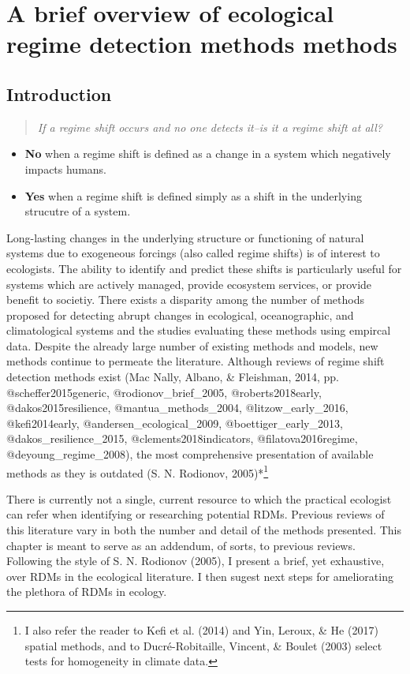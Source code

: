 \documentclass[12pt,twoside,openany]{reedthesis}
\providecommand{\tightlist}{%
  \setlength{\itemsep}{0pt}\setlength{\parskip}{0pt}}
\begin{document}
\hypertarget{rdmReview}{%
\chapter{A brief overview of ecological regime detection methods methods}\label{rdmReview}}

\hypertarget{introduction}{%
\section{Introduction}\label{introduction}}
\begin{quote}
\emph{If a regime shift occurs and no one detects it--is it a regime shift at all?}
\end{quote}
\begin{itemize}
\tightlist
\item
  \textbf{No} when a regime shift is defined as a change in a system which negatively impacts humans.
\item
  \textbf{Yes} when a regime shift is defined simply as a shift in the underlying strucutre of a system.
\end{itemize}
Long-lasting changes in the underlying structure or functioning of natural systems due to exogeneous forcings (also called regime shifts) is of interest to ecologists. The ability to identify and predict these shifts is particularly useful for systems which are actively managed, provide ecosystem services, or provide benefit to societiy. There exists a disparity among the number of methods proposed for detecting abrupt changes in ecological, oceanographic, and climatological systems and the studies evaluating these methods using empircal data. Despite the already large number of existing methods and models, new methods continue to permeate the literature. Although reviews of regime shift detection methods exist (Mac Nally, Albano, \& Fleishman, 2014, pp. @scheffer2015generic, @rodionov\_brief\_2005, @roberts2018early, @dakos2015resilience, @mantua\_methods\_2004, @litzow\_early\_2016, @kefi2014early, @andersen\_ecological\_2009, @boettiger\_early\_2013, @dakos\_resilience\_2015, @clements2018indicators, @filatova2016regime, @deyoung\_regime\_2008), the most comprehensive presentation of available methods as they is outdated (S. N. Rodionov, 2005)*\footnote{I also refer the reader to Kefi et al. (2014) and Yin, Leroux, \& He (2017) spatial methods, and to Ducré-Robitaille, Vincent, \& Boulet (2003) select tests for homogeneity in climate data.}

There is currently not a single, current resource to which the practical ecologist can refer when identifying or researching potential RDMs. Previous reviews of this literature vary in both the number and detail of the methods presented. This chapter is meant to serve as an addendum, of sorts, to previous reviews. Following the style of S. N. Rodionov (2005), I present a brief, yet exhaustive, over RDMs in the ecological literature. I then sugest next steps for ameliorating the plethora of RDMs in ecology.
\end{document}
